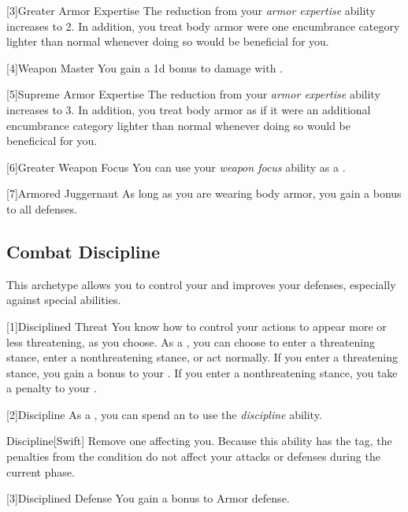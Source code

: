         [3]{Greater Armor Expertise}
        The  reduction from your \textit{armor expertise} ability increases to 2.
        In addition, you treat body armor were one encumbrance category lighter than normal whenever doing so would be beneficial for you.

        [4]{Weapon Master}
        You gain a \plus1d bonus to damage with .

        [5]{Supreme Armor Expertise}
        The  reduction from your \textit{armor expertise} ability increases to 3.
        In addition, you treat body armor as if it were an additional encumbrance category lighter than normal whenever doing so would be beneficical for you.

        [6]{Greater Weapon Focus} You can use your \textit{weapon focus} ability as a .

        [7]{Armored Juggernaut}
        As long as you are wearing body armor, you gain a  bonus to all defenses.

    \subsection{Combat Discipline}
        This archetype allows you to control your  and improves your defenses, especially against special abilities.

        [1]{Disciplined Threat}
        You know how to control your actions to appear more or less threatening, as you choose.
        As a , you can choose to enter a threatening stance, enter a nonthreatening stance, or act normally.
        If you enter a threatening stance, you gain a  bonus to your .
        If you enter a nonthreatening stance, you take a  penalty to your .

        [2]{Discipline} As a , you can spend an  to use the \textit{discipline} ability.
        \begin{ability}{Discipline}[Swift]
            Remove one  affecting you.
            Because this ability has the  tag, the penalties from the condition do not affect your attacks or defenses during the current phase.
        \end{ability}

        [3]{Disciplined Defense}
        You gain a  bonus to Armor defense.

